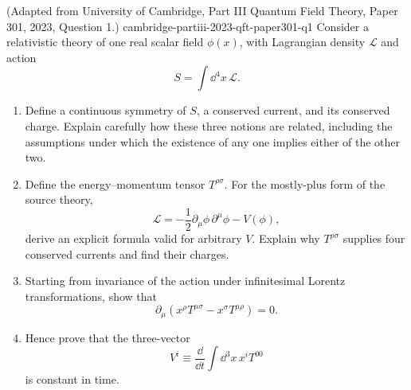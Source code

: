 
\begin{enumerate}
  {(Adapted from University of Cambridge, Part III Quantum Field Theory, Paper 301, 2023, Question 1.)}
  {cambridge-partiii-2023-qft-paper301-q1}
Consider a relativistic theory of one real scalar field \(\phi(x)\),
with Lagrangian density \(\mathcal L\) and action
\[
 S=\int \dd^4x\,\mathcal L.
\]
\begin{enumerate}
\item
Define a continuous symmetry of \(S\), a conserved current, and its
conserved charge.  Explain carefully how these three notions are
related, including the assumptions under which the existence of any
one implies either of the other two.
\item
Define the energy--momentum tensor \(T^{\rho\sigma}\).  For the
mostly-plus form of the source theory,
\[
 \mathcal L=-\frac12\partial_\mu\phi\,\partial^\mu\phi-V(\phi),
\]
derive an explicit formula valid for arbitrary \(V\).  Explain why
\(T^{\rho\sigma}\) supplies four conserved currents and find their
charges.
\item
Starting from invariance of the action under infinitesimal Lorentz
transformations, show that
\[
 \partial_\mu\left(x^\rho T^{\mu\sigma}
                   -x^\sigma T^{\mu\rho}\right)=0.
\]
\item
Hence prove that the three-vector
\[
 V^i\equiv\frac{\dd}{\dd t}\int \dd^3x\,x^iT^{00}
\]
is constant in time.
\end{enumerate}


\end{enumerate}
